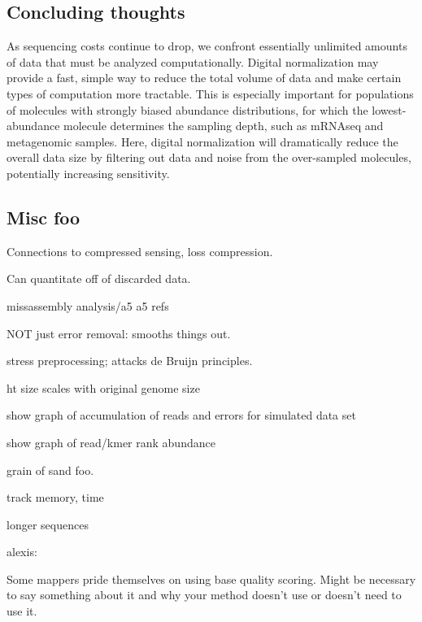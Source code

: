 \documentclass[10pt,draft]{article}
\begin{document}
\subsection{Concluding thoughts}

As sequencing costs continue to drop, we confront essentially
unlimited amounts of data that must be analyzed computationally.
Digital normalization may provide a fast, simple way to reduce the
total volume of data and make certain types of computation more
tractable.  This is especially important for populations of molecules
with strongly biased abundance distributions, for which the
lowest-abundance molecule determines the sampling depth, such as
mRNAseq and metagenomic samples.  Here, digital normalization will
dramatically reduce the overall data size by filtering out data and
noise from the over-sampled molecules, potentially increasing
sensitivity.

\subsection{Misc foo}

Connections to compressed sensing, loss compression.

Can quantitate off of discarded data.





missassembly analysis/a5
a5 refs

NOT just error removal: smooths things out.

stress preprocessing; attacks de Bruijn principles.

ht size scales with original genome size

show graph of accumulation of reads and errors for simulated data set

show graph of read/kmer rank abundance

grain of sand foo.


track memory, time

longer sequences

alexis:

Some mappers pride themselves on using base quality scoring.  Might be
necessary to say something about it and why your method doesn't use or
doesn't need to use it.
\end{document}
